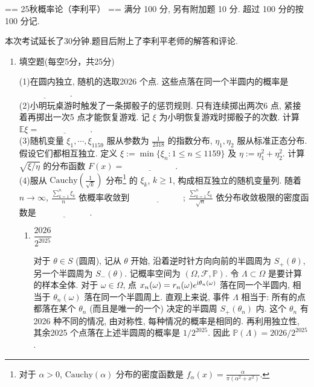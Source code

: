 == 25秋概率论（李利平） ==
满分 100 分, 另有附加题 10 分. 超过 100 分的按 100 分记.

本次考试延长了30分钟.题目后附上了李利平老师的解答和评论.
\begin{enumerate}
    \item[一、]填空题(每空5分，共25分)\par
        (1)在圆内独立, 随机的选取2026 个点. 这些点落在同一个半圆内的概率是 $\underline{\qquad\qquad\qquad}$.\\
        (2)小明玩桌游时触发了一条掷骰子的惩罚规则. 只有连续掷出两次6 点, 紧接着再掷出一次5 点才能恢复游戏. 记 $\xi$ 为小明恢复游戏时掷骰子的次数. 计算 $\mathbb{E} \xi= \underline{\qquad\qquad\qquad}$.\\
        (3)随机变量 $\xi_{1}, \cdots, \xi_{1159}$ 服从参数为 $\frac{1}{2318}$ 的指数分布, $\eta_{1}, \eta_{2}$ 服从标准正态分布. 假设它们都相互独立. 定义 $\xi:=\min \{\xi_{n}: 1 \leq n \leq 1159\}$ 及 $\eta:=\eta_{1}^{2}+\eta_{2}^{2}$. 计算 $\sqrt{\xi / \eta}$ 的分布函数 $F(x)= \underline{\qquad\qquad\qquad}$.\\
        (4)服从 $\text{Cauchy}\left(\frac{1}{\sqrt{k}}\right)$ 分布\footnote{对于 $\alpha>0$, $\text{Cauchy}(\alpha)$ 分布的密度函数是 $f_{\alpha}(x)=\frac{\alpha}{\pi(\alpha^{2}+x^{2})}$.}
        的 $\xi_{k}$, $k \geq 1$, 构成相互独立的随机变量列. 随着 $n \to \infty$, $\frac{\sum_{k=1}^{n} \xi_{k}}{n}$ 依概率收敛到 $\underline{\qquad\qquad\qquad}$; $\frac{\sum_{k=1}^{n} \xi_{k}}{\sqrt{n}}$ 依分布收敛极限的密度函数是 $\underline{\qquad\qquad\qquad}$.
    \begin{proofc}[解答]
        \begin{enumerate}[label=(\arabic*)]
\item $\boxed{\dfrac{2026}{2^{2025}}}$

对于 $\theta \in S$ (圆周), 记从 $\theta$ 开始, 沿着逆时针方向向前的半圆周为 $S_{+}(\theta)$, 另一个半圆周为 $S_{-}(\theta)$. 
记概率空间为 $(\Omega, \mathscr{F}, \mathbb{P})$. 令 $\Lambda \subset \Omega$ 是要计算的样本全体. 
对于 $\omega \in \Omega$, 点 $x_{n}(\omega)=r_{n}(\omega) e^{{\rm i} \theta_{n}(\omega)}$ 落在同一个半圆内, 相当于 $\theta_{n}(\omega)$ 落在同一个半圆周上.
直观上来说, 事件 $\Lambda$ 相当于: 所有的点都落在某个 $\theta_{n}$ (而且是唯一的一个) 决定的半圆周 $S_{+}(\theta_{n})$ 内. 
这个 $\theta_{n}$ 有2026 种不同的情况, 由对称性, 每种情况的概率是相同的. 
再利用独立性, 其余2025 个点落在上述半圆周的概率是 $1 / 2^{2025}$. 因此 $\mathbb{P}(\Lambda)=2026 / 2^{2025}$.


\end{enumerate}
\end{proofc}
\end{enumerate}
